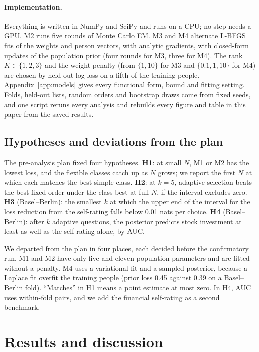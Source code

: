 \documentclass{article}
\begin{document}
\paragraph{Implementation.} Everything is written in NumPy and SciPy and runs on a CPU; no step needs a GPU. M2 runs five rounds of Monte Carlo EM. M3 and M4 alternate L-BFGS fits of the weights and person vectors, with analytic gradients, with closed-form updates of the population prior (four rounds for M3, three for M4). The rank $K \in \{1, 2, 3\}$ and the weight penalty (from $\{1, 10\}$ for M3 and $\{0.1, 1, 10\}$ for M4) are chosen by held-out log loss on a fifth of the training people. Appendix~\ref{app:models} gives every functional form, bound and fitting setting. Folds, held-out lists, random orders and bootstrap draws come from fixed seeds, and one script reruns every analysis and rebuilds every figure and table in this paper from the saved results.

\subsection{Hypotheses and deviations from the plan}\label{sec:hyp}
The pre-analysis plan fixed four hypotheses. \textbf{H1}: at small $N$, M1 or M2 has the lowest loss, and the flexible classes catch up as $N$ grows; we report the first $N$ at which each matches the best simple class. \textbf{H2}: at $k = 5$, adaptive selection beats the best fixed order under the class best at full $N$, if the interval excludes zero. \textbf{H3} (Basel--Berlin): the smallest $k$ at which the upper end of the interval for the loss reduction from the self-rating falls below 0.01 nats per choice. \textbf{H4} (Basel--Berlin): after $k$ adaptive questions, the posterior predicts stock investment at least as well as the self-rating alone, by AUC.

We departed from the plan in four places, each decided before the confirmatory run. M1 and M2 have only five and eleven population parameters and are fitted without a penalty. M4 uses a variational fit and a sampled posterior, because a Laplace fit overfit the training people (prior loss 0.45 against 0.39 on a Basel--Berlin fold). ``Matches'' in H1 means a point estimate at most zero. In H4, AUC uses within-fold pairs, and we add the financial self-rating as a second benchmark.

\section{Results and discussion}
\end{document}
